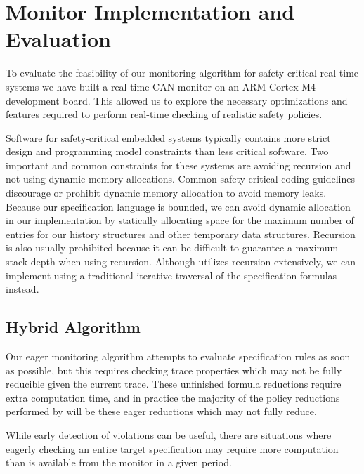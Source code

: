 
\section{Monitor Implementation and Evaluation}

To evaluate the feasibility of our monitoring algorithm for safety-critical real-time systems we have built a real-time CAN monitor on an ARM Cortex-M4 development board. This allowed us to explore the necessary optimizations and features required to perform real-time checking of realistic safety policies.


Software for safety-critical embedded systems typically contains more strict design and programming model constraints than less critical software. Two important and common constraints for these systems are avoiding recursion and not using dynamic memory allocations. 
Common safety-critical coding guidelines discourage or prohibit dynamic memory allocation to avoid memory leaks.
Because our specification language is bounded, we can avoid dynamic allocation in our \monitor implementation by statically allocating space for the maximum number of entries for our history structures and other temporary data structures.
Recursion is also usually prohibited because it can be difficult to guarantee a maximum stack depth when using recursion. Although \monitor utilizes recursion extensively, we can implement \monitor using a traditional iterative traversal of the specification formulas instead.

\subsection{Hybrid Algorithm}
Our eager monitoring algorithm attempts to evaluate specification rules as soon as possible, but this requires checking trace properties which may not be fully reducible given the current trace. These unfinished formula reductions require extra computation time, and in practice the majority of the policy reductions performed by \monitor will be these eager reductions which may not fully reduce.

While early detection of violations can be useful, there are situations where eagerly checking an entire target specification may require more computation than is available from the monitor in a given period.

